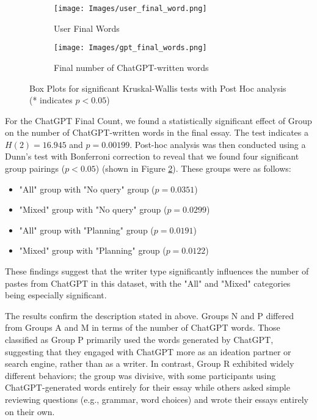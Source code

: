 \documentclass[manuscript,screen,acmsmall]{acmart}
\begin{document}
\begin{figure}[h!]
    \centering
    \begin{subfigure}[b]{0.45\textwidth}
        \centering
        \texttt{[image: Images/user\_final\_word.png]} 
        \caption{User Final Words} 
        \label{fig:user_final} 
    \end{subfigure}
    \hfill 
    \begin{subfigure}[b]{0.45\textwidth} 
        \centering
        \texttt{[image: Images/gpt\_final\_words.png]}
        \caption{Final number of ChatGPT-written words }
        \label{fig:gpt_final} 
    \end{subfigure}

    \caption{Box Plots for significant Kruskal-Wallis tests with Post Hoc analysis (* indicates $p < 0.05$)}
    \label{fig:final_words_box} 
\end{figure}

For the ChatGPT Final Count, we found a statistically significant effect of Group on the number of ChatGPT-written words in the final essay. The test indicates a $H(2) = 16.945$ and $p = 0.00199$. Post-hoc analysis was then conducted using a Dunn's test with Bonferroni correction to reveal that we found four significant group pairings ($p < 0.05$) (shown in Figure \ref{fig:gpt_final}). These groups were as follows:
\begin{itemize}
    \item "All" group with "No query" group ($p = 0.0351$)
    \item "Mixed" group with "No query" group ($p = 0.0299$)
    \item "All" group with "Planning" group ($p = 0.0191$)
    \item "Mixed" group with "Planning" group ($p = 0.0122$)
\end{itemize}
These findings suggest that the writer type significantly influences the number of pastes from ChatGPT in this dataset, with the "All" and "Mixed" categories being especially significant.




The results confirm the description stated in above. Groups N and P differed from Groups A and M in terms of the number of ChatGPT words. Those classified as Group P primarily used the words generated by ChatGPT, suggesting that they engaged with ChatGPT more as an ideation partner or search engine, rather than as a writer. In contrast, Group R exhibited widely different behaviors; the group was divisive, with some participants using ChatGPT-generated words entirely for their essay while others asked simple reviewing questions (e.g., grammar, word choices) and wrote their essays entirely on their own.
\end{document}

